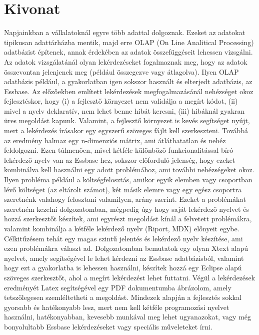 \chapter*{Kivonat}
Napjainkban a vállalatoknál egyre több adattal dolgoznak. Ezeket az adatokat tipikusan adattárházba mentik, majd erre OLAP (On Line Analitical Processing) adatbázist építenek, annak érdekében az adatok összefüggéseit lehessen vizsgálni. Az adatok vizsgálatánál olyan lekérdezéseket fogalmaznak meg, hogy az adatok összevontan jelenjenek meg (például összegezve vagy átlagolva). Ilyen OLAP adatbázis például, a gyakorlatban igen sokszor használt és elterjedt adatbázis, az Essbase.
Az előzőekben említett lekérdezések megfogalmazásánál nehézséget okoz fejlesztéskor, hogy (i) a fejlesztő környezet nem validálja a megírt kódot, (ii) mivel a nyelv deklaratív, nem lehet benne hibát keresni, (iii) hibáknál gyakran üres megoldást kapunk. Valamint, a fejlesztő környezet is kevés segítséget nyújt, mert a lekérdezés írásakor egy egyszerű szöveges fájlt kell szerkeszteni. Továbbá az eredmény halmaz egy n-dimenziós mátrix, ami átláthatatlan és nehéz feldolgozni. Ezen túlmenően, mivel kétféle különböző funkcionalitással bíró lekérdező nyelv van az Essbase-hez, sokszor előforduló jelenség, hogy ezeket kombinálva kell használni egy adott problémához, ami további nehézségeket okoz. Ilyen probléma például a költségfelosztás, amikor egyik elemben vagy csoportban lévő költséget (az eltárolt számot), két másik elemre vagy egy egész csoportra szeretnénk valahogy felosztani valamilyen, arány szerint.
Ezeket a problémákat szeretném kezelni dolgozatomban, mégpedig úgy hogy saját lekérdező nyelvet és hozzá szerkesztőt készítek, ami egyrészt megoldást kínál a felvetett problémákra, valamint kombinálja a kétféle lekérdező nyelv (Riport, MDX) előnyeit egybe. Célkitűzésem tehát egy magas szintű jelentés és lekérdező nyelv készítése, ami ezen problémákra választ ad.
Dolgozatomban bemutatok egy olyan Xtext alapú nyelvet, amely segítségével le lehet kérdezni az Essbase adatbázisból, valamint hogy ezt a gyakorlatba is lehessen használni, készítek hozzá egy Eclipse alapú szöveges szerkesztőt, ahol a megírt lekérdezést lehet futtatni. Végül a lekérdezések eredményét Latex segítségével egy PDF dokumentumba ábrázolom, amely tetszőlegesen szemléltetheti a megoldást.
Mindezek alapján a fejlesztés sokkal gyorsabb és hatékonyabb lesz, mert nem kell kétféle programozási nyelvet használni, hatékonyabban, kevesebb munkával meg lehet ugyanazokat, vagy még bonyolultabb Essbase lekérdezéseket vagy speciális műveleteket írni.




 
